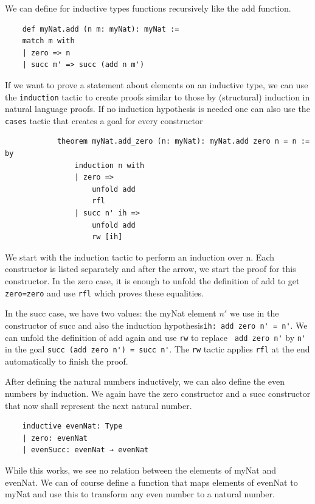 We can define for inductive types functions recursively like the add function.

\begin{lstlisting}
    def myNat.add (n m: myNat): myNat :=
    match m with
    | zero => n
    | succ m' => succ (add n m')
\end{lstlisting}

If we want to prove a statement about elements on an inductive type, we can use the \lstinline|induction| tactic to create proofs similar to those by (structural) induction in natural language proofs. If no induction hypothesis is needed one can also use the \lstinline|cases| tactic that creates a goal for every constructor

\begin{lstlisting}
            theorem myNat.add_zero (n: myNat): myNat.add zero n = n := by
                induction n with
                | zero =>
                    unfold add
                    rfl
                | succ n' ih =>
                    unfold add
                    rw [ih]
\end{lstlisting}

We start with the induction tactic to perform an induction over n. Each constructor is listed separately and after the arrow, we start the proof for this constructor. In the zero case, it is enough to unfold the definition of add to get \lstinline|zero=zero| and use \lstinline|rfl| which proves these equalities.

In the succ case, we have two values:  the myNat element $n'$ we use in the constructor of succ and also the induction hypothesis\lstinline|ih: add zero n' = n'|. We can unfold the definition of add again and use \lstinline|rw| to replace \lstinline| add zero n'| by \lstinline|n'| in the goal \lstinline|succ (add zero n') = succ n'|. The \lstinline|rw| tactic applies \lstinline|rfl| at the end automatically to finish the proof.

After defining the natural numbers inductively, we can also define the even numbers by induction. We again have the zero constructor and a succ constructor that now shall represent the next natural number.

\begin{lstlisting}
    inductive evenNat: Type
    | zero: evenNat
    | evenSucc: evenNat → evenNat
\end{lstlisting}

While this works, we see no relation between the elements of myNat and evenNat. We can of course define a function that maps elements of evenNat to myNat and use this to transform any even number to a natural number.

